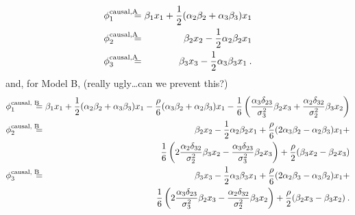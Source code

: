 \documentclass{article}
\newcommand{\contribution}{{\phi}}
\newcommand{\boven}[2]{#1^{\mbox{\scriptsize #2}}}
\newcommand{\isequal}{\hspace*{-2.5mm} & = & \hspace*{-2.5mm}}
\newcommand{\comment}[1]{{\color{red} #1}}
\begin{document}
\begin{eqnarray*}
	\boven{\contribution_1}{causal,A} \isequal \beta_1 x_1 + {1 \over 2} (\alpha_2 \beta_2 + \alpha_3  \beta_3) x_1  \\
	\boven{\contribution_2}{causal,A} \isequal \beta_2 x_2 - {1 \over 2} \alpha_2 \beta_2 x_1 \\
	\boven{\contribution_3}{causal,A} \isequal \beta_3 x_3 - {1 \over 2} \alpha_3 \beta_3 x_1  \: .
\end{eqnarray*}
and, for Model B, \comment{(really ugly\ldots can we prevent this?)}
\begin{eqnarray*}
	\boven{\contribution_1}{causal, B} \isequal \beta_1 x_1 + {1 \over 2} (\alpha_2 \beta_2 + \alpha_3 \beta_3) x_1 - {\rho \over 6} (\alpha_3 \beta_2 + \alpha_2 \beta_3) x_1 - {1 \over 6} \left( {\alpha_3 \delta_{23} \over \sigma_3^2} \beta_2 x_3 + {\alpha_2 \delta_{32} \over \sigma_2^2} \beta_3 x_2 \right) \\
	\boven{\contribution_2}{causal, B} \isequal \beta_2 x_2 - {1 \over 2} \alpha_2 \beta_2 x_1 + {\rho \over 6} (2 \alpha_3 \beta_2 - \alpha_2 \beta_3) x_1 + \\
	&& {1 \over 6} \left(2 {\alpha_2 \delta_{32} \over \sigma_2^2} \beta_3 x_2 - {\alpha_3 \delta_{23} \over \sigma_3^2} \beta_2 x_3 \right) + {\rho \over 2} (\beta_3 x_2 - \beta_2 x_3) \\
	\boven{\contribution_3}{causal, B} \isequal \beta_3 x_3 - {1 \over 2} \alpha_3 \beta_3 x_1 + {\rho \over 6} (2 \alpha_2 \beta_3 - \alpha_3 \beta_2) x_1 + \\
	&& {1 \over 6} \left(2 {\alpha_3 \delta_{23} \over \sigma_3^2} \beta_2 x_3 - {\alpha_2 \delta_{32} \over \sigma_2^2} \beta_3 x_2 \right) + {\rho \over 2} (\beta_2 x_3 - \beta_3 x_2) \: .
\end{eqnarray*}
\end{document}
